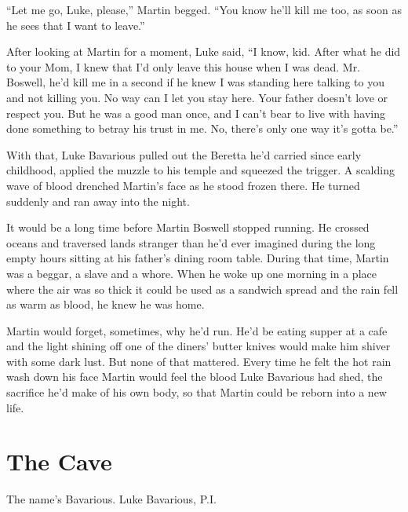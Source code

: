 ``Let me go, Luke, please,'' Martin begged. ``You know he'll kill me
too, as soon as he sees that I want to leave.''



After looking at Martin for a moment, Luke said, ``I know, kid.
After what he did to your Mom, I knew that I'd only leave this
house when I was dead. Mr. Boswell, he'd kill me in a second if he
knew I was standing here talking to you and not killing you. No way
can I let you stay here. Your father doesn't love or respect you.
But he was a good man once, and I can't bear to live with having
done something to betray his trust in me. No, there's only one way
it's gotta be.''



With that, Luke Bavarious pulled out the Beretta he'd carried since
early childhood, applied the muzzle to his temple and squeezed the
trigger. A scalding wave of blood drenched Martin's face as he
stood frozen there. He turned suddenly and ran away into the
night.



It would be a long time before Martin Boswell stopped running. He
crossed oceans and traversed lands stranger than he'd ever imagined
during the long empty hours sitting at his father's dining room
table. During that time, Martin was a beggar, a slave and a whore.
When he woke up one morning in a place where the air was so thick
it could be used as a sandwich spread and the rain fell as warm as
blood, he knew he was home.



Martin would forget, sometimes, why he'd run. He'd be eating supper
at a cafe and the light shining off one of the diners' butter
knives would make him shiver with some dark lust. But none of that
mattered. Every time he felt the hot rain wash down his face Martin
would feel the blood Luke Bavarious had shed, the sacrifice he'd
make of his own body, so that Martin could be reborn into a new
life. 
 




\chapter{The Cave}



The name's Bavarious. Luke Bavarious, P.I.



